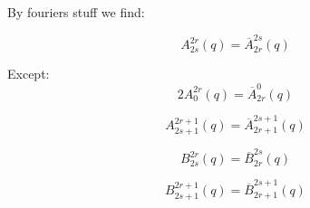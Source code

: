 \documentclass{article}
\begin{document}
By fouriers stuff we find:

\begin{equation}
    A_{2s}^{2r}(q) = \overline{A}_{2r}^{2s}(q)
\end{equation}

Except:
\begin{equation}
    2A_{0}^{2r}(q) = \overline{A}_{2r}^{0}(q)
\end{equation}

\begin{equation}
    A_{2s+1}^{2r+1}(q) = \overline{A}_{2r+1}^{2s+1}(q)
\end{equation}

\begin{equation}
    B_{2s}^{2r}(q) = \overline{B}_{2r}^{2s}(q)
\end{equation}

\begin{equation}
    B_{2s+1}^{2r+1}(q) = \overline{B}_{2r+1}^{2s+1}(q)
\end{equation}
\end{document}
